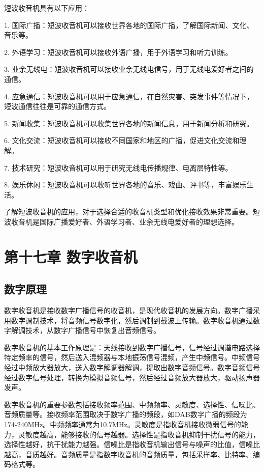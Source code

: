 \documentclass[12pt,UTF8]{ctexbook}
\begin{document}
短波收音机具有以下应用：

1. 国际广播：短波收音机可以接收世界各地的国际广播，了解国际新闻、文化、音乐等。

2. 外语学习：短波收音机可以接收外语广播，用于外语学习和听力训练。

3. 业余无线电：短波收音机可以接收业余无线电信号，用于无线电爱好者之间的通信。

4. 应急通信：短波收音机可以用于应急通信，在自然灾害、突发事件等情况下，短波通信往往是可靠的通信方式。

5. 新闻收集：短波收音机可以收集世界各地的新闻信息，用于新闻分析和研究。

6. 文化交流：短波收音机可以接收不同国家和地区的广播，促进文化交流和理解。

7. 技术研究：短波收音机可以用于研究无线电传播规律、电离层特性等。

8. 娱乐休闲：短波收音机可以收听世界各地的音乐、戏曲、评书等，丰富娱乐生活。

了解短波收音机的应用，对于选择合适的收音机类型和优化接收效果非常重要。短波收音机是国际广播爱好者、外语学习者、业余无线电爱好者的理想选择。

\chapter{第十七章 数字收音机}

\section{数字原理}

数字收音机是接收数字广播信号的收音机，是现代收音机的发展方向。数字广播采用数字调制技术，将音频信号数字化，然后调制到载波上传输。数字收音机通过数字解调技术，从数字广播信号中恢复出音频信号。

数字收音机的基本工作原理是：天线接收到数字广播信号，信号经过调谐电路选择特定频率的信号，然后送入混频器与本地振荡信号混频，产生中频信号。中频信号经过中频放大器放大，送入数字解调器解调，提取出数字音频信号。数字音频信号经过数字信号处理，转换为模拟音频信号，然后经过音频放大器放大，驱动扬声器发声。

数字收音机的重要参数包括接收频率范围、中频频率、灵敏度、选择性、信噪比、音频质量等。接收频率范围取决于数字广播的频段，如DAB数字广播的频段为174-240MHz。中频频率通常为10.7MHz。灵敏度是指收音机接收微弱信号的能力，灵敏度越高，能够接收的信号越弱。选择性是指收音机抑制干扰信号的能力，选择性越好，抗干扰能力越强。信噪比是指收音机输出信号与噪声的比值，信噪比越高，音质越好。音频质量是指数字收音机的音频质量，包括采样率、比特率、编码格式等。
\end{document}
